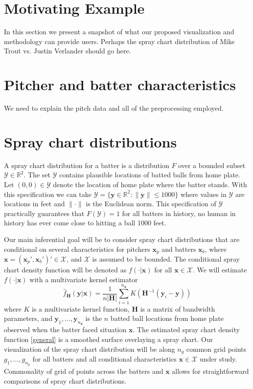 \documentclass[11pt]{article}
\newcommand{\R}{\mathbb{R}}
\newcommand{\Y}{\mathcal{Y}}
\newcommand{\X}{\mathcal{X}}
\newcommand{\Hbf}{\textbf{H}}
\newcommand{\y}{\textbf{y}}
\newcommand{\x}{\textbf{x}}
\begin{document}
\section{Motivating Example}

In this section we present a snapshot of what our proposed visualization and methodology can provide users. Perhaps the spray chart distribution of Mike Trout vs. Justin Verlander should go here.


\section{Pitcher and batter characteristics}

We need to explain the pitch data and all of the preprocessing employed. 


\section{Spray chart distributions}

A spray chart distribution for a batter is a distribution $F$ over a bounded subset $\Y \in \R^2$. The set $\Y$ contains plausible locations of batted balls from home plate. Let $(0,0) \in \Y$ denote the location of home plate where the batter stands. With this specification we can take $\Y = \{\y \in \R^2: \|\y\| \leq 1000\}$ where values in $\Y$ are locations in feet and $\|\cdot\|$ is the Euclidean norm. This specification of $\Y$ practically guarantees that $F(\Y) = 1$ for all batters in history, no human in history has ever come close to hitting a ball 1000 feet.

Our main inferential goal will be to consider spray chart distributions that are conditional on several characteristics for pitchers $\x_p$ and batters $\x_b$, where $\x = (\x_p',\x_b')' \in \X$, and $\X$ is assumed to be bounded. The conditional spray chart density function will be denoted as $f(\cdot|\x)$ for all $\x \in \X$. We will estimate $f(\cdot|\x)$ with a multivariate kernel estimator
\begin{equation} \label{general}
  \hat f_\Hbf(\y|\x) = \frac{1}{n|\Hbf|}\sum_{i=1}^{n_\x} K\left(\Hbf^{-1}(\y_i - \y)\right)
\end{equation}
where $K$ is a multivariate kernel function, $\Hbf$ is a matrix of bandwidth parameters, and 
$\y_1,\ldots,\y_{n_\x}$ is the $n$ batted ball locations from home plate observed when the batter faced situation $\x$. The estimated spray chart density function \eqref{general} is a smoothed surface overlaying a spray chart. Our visualization of the spray chart distribution will be along $n_g$ common grid points $g_1,\ldots,g_{n_g}$ for all batters and all conditional characteristics $\x \in \X$ under study. Commonality of grid of points across the batters and $\x$ allows for straightforward comparisons of spray chart distributions.
\end{document}
